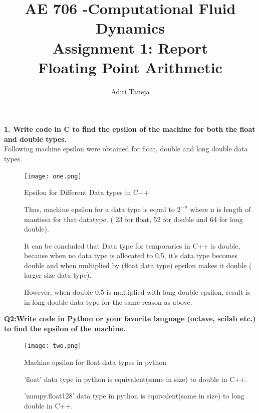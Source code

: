 \documentclass{article}
\title{AE 706 -Computational Fluid Dynamics \\ Assignment 1: Report \\ Floating Point Arithmetic}
\author{Aditi Taneja}
\date{}
\begin{document}
\maketitle

\textbf{1. Write code in C to find the epsilon of the machine for both the float and double types.} 
\\
\newline
Following machine epsilon were obtained for float, double and long double data types.

\begin{figure}[H] \label{figure}
\texttt{[image: one.png]}
\caption{Epsilon for Different Data types in C++}
\label{figure:}
\end{figure}

\begin{description}
\item[]Thus, machine epsilon for a data type is equal to $2^{-n}$ where n is length of mantissa for that datatype. ( 23 for float, 52 for double and 64 for long double).
\item[]It can be concluded that Data type for temporaries in C++ is double, because when no data type is allocated to 0.5, it's data type becomes double and when multiplied by (float data type) epsilon makes it double ( larger size data type).
\item[]However, when double 0.5 is multiplied with long double epsilon, result is in long double data type for the same reason as above.
\end{description}

\textbf{Q2:Write code in Python or your favorite language (octave, scilab etc.) to find the epsilon of the machine.}

\begin{figure}[H] \label{figure}
\texttt{[image: two.png]}
\caption{Machine epsilon for float data types in python}
\label{figure:}
\end{figure}
\begin{description}
\item[]'float' data type in python is equivalent(same in size) to double in C++.
\item[]'numpy.float128' data type in python is equivalent(same in size) to long double in C++. 
\end{description}
\end{document}
